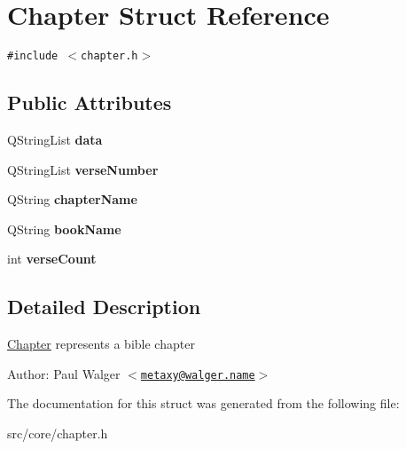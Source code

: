 \hypertarget{structChapter}{
\section{Chapter Struct Reference}
\label{structChapter}
}
{\tt \#include $<$chapter.h$>$}

\subsection*{Public Attributes}
\begin{CompactItemize}
\item 
\hypertarget{structChapter_321e378b12d5fed1ba2fae4affdb78c7}{
QStringList \textbf{data}}
\label{structChapter_321e378b12d5fed1ba2fae4affdb78c7}

\item 
\hypertarget{structChapter_29c571d490cce0129070cefe1fe0da61}{
QStringList \textbf{verseNumber}}
\label{structChapter_29c571d490cce0129070cefe1fe0da61}

\item 
\hypertarget{structChapter_33e98674c40021c573e2395cc53f5dc2}{
QString \textbf{chapterName}}
\label{structChapter_33e98674c40021c573e2395cc53f5dc2}

\item 
\hypertarget{structChapter_7fcbb066f25d59fb5877582ab7dad46c}{
QString \textbf{bookName}}
\label{structChapter_7fcbb066f25d59fb5877582ab7dad46c}

\item 
\hypertarget{structChapter_f1670eaa97d549f1d95686507665a1aa}{
int \textbf{verseCount}}
\label{structChapter_f1670eaa97d549f1d95686507665a1aa}

\end{CompactItemize}


\subsection{Detailed Description}
\hyperlink{structChapter}{Chapter} represents a bible chapter

\begin{Desc}
\item[Author:]Paul Walger $<$\href{mailto:metaxy@walger.name}{\tt metaxy@walger.name}$>$ \end{Desc}


The documentation for this struct was generated from the following file:\begin{CompactItemize}
\item 
src/core/chapter.h\end{CompactItemize}
